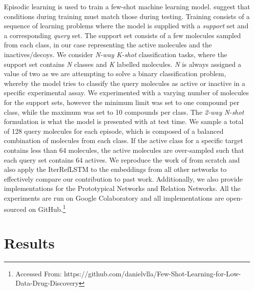 \documentclass[journal=acscii,manuscript=article]{achemso}
\begin{document}
Episodic learning is used to train a few-shot machine learning model. \citet{vinyals2016matching} suggest that conditions during training must match those during testing. Training consists of a sequence of learning problems where the model is supplied with a \textit{support} set and a corresponding \textit{query} set. The support set consists of a few molecules sampled from each class, in our case representing the active molecules and the inactives/decoys. We consider \textit{N-way K-shot} classification tasks, where the support set contains \textit{N} classes and \textit{K} labelled molecules. \textit{N} is always assigned a value of two as we are attempting to solve a binary classification problem, whereby the model tries to classify the query molecules as active or inactive in a specific experimental assay. We experimented with a varying number of molecules for the support sets, however the minimum limit was set to one compound per class, while the maximum was set to 10 compounds per class. The \textit{2-way N-shot} formulation is what the model is presented with at test time. We sample a total of 128 query molecules for each episode, which is composed of a balanced combination of molecules from each class. If the active class for a specific target contains less than 64 molecules, the active molecules are over-sampled such that each query set contains 64 actives. We reproduce the work of \citet{altae2017low} from scratch and also apply the IterRefLSTM to the embeddings from all other networks to effectively compare our contribution to past work. Additionally, we also provide implementations for the Prototypical Networks and Relation Networks. All the experiments are run on Google Colaboratory and all implementations are open-sourced on GitHub.\footnote{Accessed From: https://github.com/danielvlla/Few-Shot-Learning-for-Low-Data-Drug-Discovery}


\section{Results}
\end{document}
